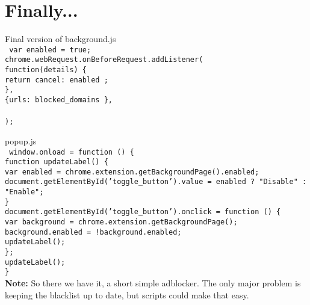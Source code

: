 \documentclass[12pt]{article}
\begin{document}
	\part*{Finally...}
	Final version of background.js \\
	\texttt{
	var enabled = true; \\
	chrome.webRequest.onBeforeRequest.addListener( \\
	function(details) \{ \\
		return {cancel: enabled }; \\
	\}, \\
	\{urls: blocked\_domains \}, \\
	["blocking"] \\
	); \\
}

	popup.js \\
	\texttt{
	window.onload = function () \{ \\
		function updateLabel() \{ \\
			var enabled = chrome.extension.getBackgroundPage().enabled; \\
			document.getElementById('toggle\_button').value = enabled ? "Disable" : "Enable"; \\
		\} \\
		document.getElementById('toggle\_button').onclick = function () \{ \\
			var background = chrome.extension.getBackgroundPage(); \\
			background.enabled = !background.enabled; \\
			updateLabel(); \\
		\}; \\
		updateLabel(); \\
	\}
} \\
	\textbf{Note:} So there we have it, a short simple adblocker. The only major problem is keeping the blacklist up to date, but scripts could make that easy. 
\end{document}
